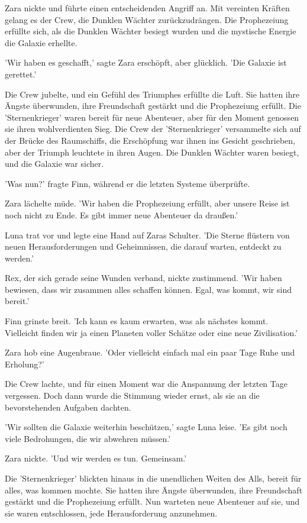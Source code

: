 \documentclass[12pt]{article}
\begin{document}
Zara nickte und führte einen entscheidenden Angriff an. Mit vereinten Kräften gelang es der Crew, die Dunklen Wächter zurückzudrängen. Die Prophezeiung erfüllte sich, als die Dunklen Wächter besiegt wurden und die mystische Energie die Galaxie erhellte.

'Wir haben es geschafft,' sagte Zara erschöpft, aber glücklich. 'Die Galaxie ist gerettet.'

Die Crew jubelte, und ein Gefühl des Triumphes erfüllte die Luft. Sie hatten ihre Ängste überwunden, ihre Freundschaft gestärkt und die Prophezeiung erfüllt. Die 'Sternenkrieger' waren bereit für neue Abenteuer, aber für den Moment genossen sie ihren wohlverdienten Sieg. Die Crew der 'Sternenkrieger' versammelte sich auf der Brücke des Raumschiffs, die Erschöpfung war ihnen ins Gesicht geschrieben, aber der Triumph leuchtete in ihren Augen. Die Dunklen Wächter waren besiegt, und die Galaxie war sicher.

'Was nun?' fragte Finn, während er die letzten Systeme überprüfte.

Zara lächelte müde. 'Wir haben die Prophezeiung erfüllt, aber unsere Reise ist noch nicht zu Ende. Es gibt immer neue Abenteuer da draußen.'

Luna trat vor und legte eine Hand auf Zaras Schulter. 'Die Sterne flüstern von neuen Herausforderungen und Geheimnissen, die darauf warten, entdeckt zu werden.'

Rex, der sich gerade seine Wunden verband, nickte zustimmend. 'Wir haben bewiesen, dass wir zusammen alles schaffen können. Egal, was kommt, wir sind bereit.'

Finn grinste breit. 'Ich kann es kaum erwarten, was als nächstes kommt. Vielleicht finden wir ja einen Planeten voller Schätze oder eine neue Zivilisation.'

Zara hob eine Augenbraue. 'Oder vielleicht einfach mal ein paar Tage Ruhe und Erholung?'

Die Crew lachte, und für einen Moment war die Anspannung der letzten Tage vergessen. Doch dann wurde die Stimmung wieder ernst, als sie an die bevorstehenden Aufgaben dachten.

'Wir sollten die Galaxie weiterhin beschützen,' sagte Luna leise. 'Es gibt noch viele Bedrohungen, die wir abwehren müssen.'

Zara nickte. 'Und wir werden es tun. Gemeinsam.'

Die 'Sternenkrieger' blickten hinaus in die unendlichen Weiten des Alls, bereit für alles, was kommen mochte. Sie hatten ihre Ängste überwunden, ihre Freundschaft gestärkt und die Prophezeiung erfüllt. Nun warteten neue Abenteuer auf sie, und sie waren entschlossen, jede Herausforderung anzunehmen.
\end{document}
